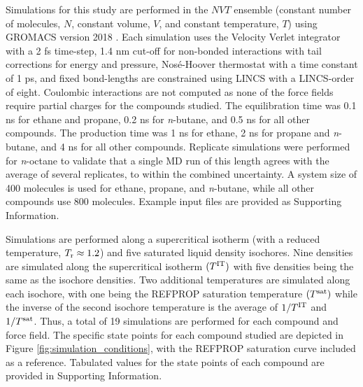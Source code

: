 \documentclass[journal=jctc,manuscript=article]{achemso}
\begin{document}
Simulations for this study are performed in the $NVT$ ensemble (constant number of molecules, $N$, constant volume, $V$, and constant temperature, $T$) using GROMACS version 2018 \cite{GROMACS_2018}. Each simulation uses the Velocity Verlet integrator with a 2 fs time-step, 1.4 nm cut-off for non-bonded interactions with tail corrections for energy and pressure, Nos{\'e}-Hoover thermostat with a time constant of 1 ps, and fixed bond-lengths are constrained using LINCS with a LINCS-order of eight. Coulombic interactions are not computed as none of the force fields require partial charges for the compounds studied. The equilibration time was 0.1 ns for ethane and propane, 0.2 ns for \textit{n}-butane, and 0.5 ns for all other compounds. The production time was 1 ns for ethane, 2 ns for propane and \textit{n}-butane, and 4 ns for all other compounds. Replicate simulations were performed for \textit{n}-octane to validate that a single MD run of this length agrees with the average of several replicates, to within the combined uncertainty. A system size of 400 molecules is used for ethane, propane, and \textit{n}-butane, while all other compounds use 800 molecules. Example input files are provided as Supporting Information.

Simulations are performed along a supercritical isotherm (with a reduced temperature, $T_{\rm r} \approx 1.2$) and five saturated liquid density isochores. Nine densities are simulated along the supercritical isotherm $(T^{\rm IT})$ with five densities being the same as the isochore densities. Two additional temperatures are simulated along each isochore, with one being the REFPROP saturation temperature $(T^{\rm sat})$ while the inverse of the second isochore temperature is the average of $1/T^{\rm IT}$ and $1/T^{\rm sat}$. Thus, a total of 19 simulations are performed for each compound and force field. The specific state points for each compound studied are depicted in Figure \ref{fig:simulation_conditions}, with the REFPROP saturation curve included as a reference. Tabulated values for the state points of each compound are provided in Supporting Information.
\end{document}

